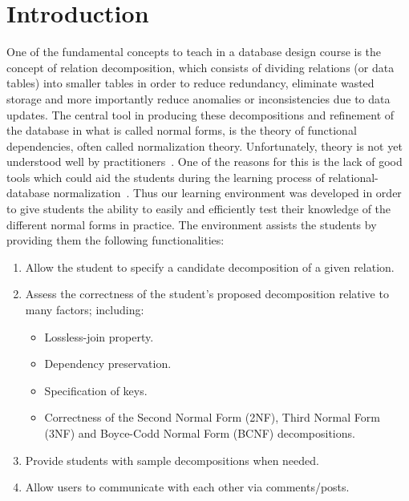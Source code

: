 \chapter{Introduction}
\label{chap:introduction}
One of the fundamental concepts to teach in a database design course is the concept of
relation decomposition, which consists of dividing relations (or data tables) into smaller
tables in order to reduce redundancy, eliminate wasted storage and more importantly reduce
anomalies or inconsistencies due to data updates. The central tool in producing these
decompositions and refinement of the database in what is called normal forms, is the theory
of functional dependencies, often called normalization theory. 
Unfortunately, theory is not yet understood well by practitioners~\cite{p1}.
One of the reasons for this is the lack of good tools which could aid the students 
during the learning process of relational-database normalization~\cite{p8}. 
Thus our learning environment was developed in order to give students the ability to 
easily and efficiently test
their knowledge of the different normal forms in practice. The environment assists the students by 
providing them the following functionalities:

\begin{enumerate}
	\item Allow the student to specify a candidate decomposition of a given relation.
	\item Assess the correctness of the student's proposed decomposition relative to many factors; including:
		\begin{itemize}
			\item Lossless-join property.
			\item Dependency preservation.
			\item Specification of keys.
			\item Correctness of the Second Normal Form (2NF), Third Normal Form (3NF) and
			 Boyce-Codd Normal Form (BCNF) decompositions.
		\end{itemize}
	\item Provide students with sample decompositions when needed. 
	\item Allow users to communicate with each other via comments/posts.
\end{enumerate}



